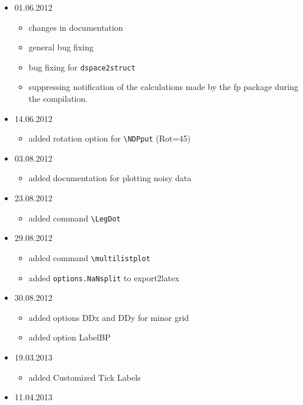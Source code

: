 \begin{itemize}
\begin{itemize}
     \item added \verb+\NDPvline, \NDPhline, \NDPvbox+ and \verb+\NDPhbox+
     \end{itemize}
 	\item 01.06.2012
     \begin{itemize}
     	\item changes in documentation
     	\item general bug fixing
     	\item bug fixing for \texttt{dspace2struct}
     	\item suppressing notification of the calculations made by the fp package
     	during the compilation.
   \end{itemize}
   \item 14.06.2012
   \begin{itemize}
     \item added rotation option for \verb+\NDPput+ (Rot=45)
   \end{itemize}
   \item 03.08.2012
   \begin{itemize}
     \item added documentation for plotting noisy data
   \end{itemize}
   \item 23.08.2012
   \begin{itemize}
     \item added command \verb+\LegDot+
   \end{itemize}
   \item 29.08.2012
   \begin{itemize}
     \item added command \verb+\multilistplot+
     \item added \verb+options.NaNsplit+ to export2latex
   \end{itemize}
   \item 30.08.2012
   \begin{itemize}
     \item added options DDx and DDy for minor grid
     \item added option LabelBP
   \end{itemize}
   \item 19.03.2013
   \begin{itemize}
   	\item added Customized Tick Labels
   \end{itemize}
  \item 11.04.2013
   \begin{itemize}

\end{itemize}
\end{itemize}
